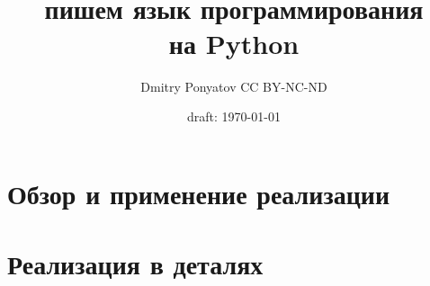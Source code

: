 

\author{Dmitry Ponyatov  CC BY-NC-ND}
\title{{\Huge \ \\\hico}\\пишем язык программирования\\на Python}
\date{draft: \today}



\maketitle
\tableofcontents



\part{Обзор и применение реализации \hico}

\part{Реализация в деталях}\secdown






\secup




